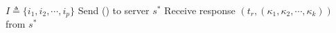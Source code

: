 \begin{algorithm*}[!ht]
\begin{algorithmic}[2]
\vspace{-1.5em}
 \\\hrulefill
\vspace{-1.5em}
      \begin{multicols}{1}{\footnotesize    
          \State $I\triangleq \{i_1, i_2, \cdots, i_p \}$
            \Part{ \underline{\getTagArray}} {
          \State  Send  (\getTagArrayTag) to server $s^*$
          \State  Receive response  $(t_r, ({\kappa}_1, {\kappa}_2, \cdots, {\kappa}_k))$ from  $s^*$
        }\EndPart 
            \Statex
          \EndPart
        }\end{multicols}

    

\end{algorithmic}
\end{algorithm*}
